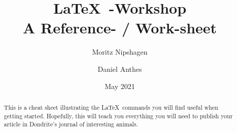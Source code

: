 \documentclass{scrarticle}
\title{\LaTeX~-Workshop\\{\large A Reference- / Work-sheet}}
\author{Moritz Nipshagen \and Daniel Anthes}
\date{May 2021}
\begin{document}
\maketitle

\tableofcontents
\newpage

\begin{abstract}
    This is a cheat sheet illustrating the \LaTeX~commands you will find useful when getting started.
    Hopefully, this will teach you everything you will need to publish your article in Dondrite's journal of interesting animals.
\end{abstract}





















\newpage
\printbibliography
\end{document}
